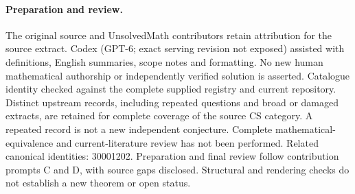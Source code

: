 \documentclass[11pt]{article}
\begin{document}
\paragraph{Preparation and review.}
The original source and UnsolvedMath contributors retain attribution for the source extract. Codex (GPT-6; exact serving revision not exposed) assisted with definitions, English summaries, scope notes and formatting. No new human mathematical authorship or independently verified solution is asserted. Catalogue identity checked against the complete supplied registry and current repository. Distinct upstream records, including repeated questions and broad or damaged extracts, are retained for complete coverage of the source CS category. A repeated record is not a new independent conjecture. Complete mathematical-equivalence and current-literature review has not been performed. Related canonical identities: 30001202. Preparation and final review follow contribution prompts C and D, with source gaps disclosed. Structural and rendering checks do not establish a new theorem or open status.
\label{end:statement}
\end{document}

